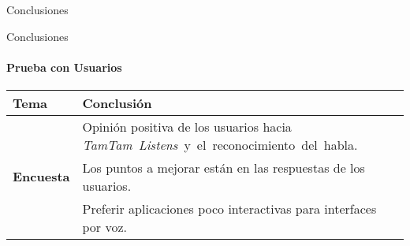 \begin{frame}{Conclusiones}

\end{frame}

\begin{frame}{Conclusiones}
\framesubtitle{Prueba con Usuarios}

\begin{table}[ht]
  \begin{tabular}{|p{2cm}|p{8.5cm}|}
    \hline
    Tema & Conclusi\'on \\
    \hline
    \multirow{3}{2cm}{\textbf{Encuesta}} & Opini\'on positiva de los usuarios hacia \mbox{\emph{TamTam Listens} y el reconocimiento del habla.}\\
    \hhline{~-}
    & Los puntos a mejorar est\'an en las respuestas de los usuarios.\\
    \hhline{~-}
    & Preferir aplicaciones poco interactivas para interfaces por voz.\\
    \hline
  \end{tabular}
\end{table}
\end{frame}